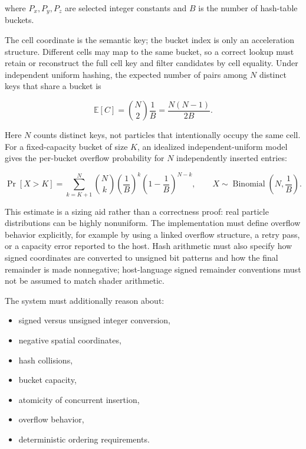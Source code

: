 \documentclass[11pt,a4paper,oneside]{report}
\begin{document}
where $P_x,P_y,P_z$ are selected integer constants and $B$ is the number of hash-table buckets.

The cell coordinate is the semantic key; the bucket index is only an acceleration structure.
Different cells may map to the same bucket, so a correct lookup must retain or reconstruct the
full cell key and filter candidates by cell equality. Under independent uniform hashing, the
expected number of pairs among $N$ distinct keys that share a bucket is

\begin{equation}
\mathbb{E}[C]=\binom{N}{2}\frac{1}{B}
=\frac{N(N-1)}{2B}.
\end{equation}

Here $N$ counts distinct keys, not particles that intentionally occupy the same cell. For a
fixed-capacity bucket of size $K$, an idealized independent-uniform model gives the per-bucket
overflow probability for $N$ independently inserted entries:

\begin{equation}
\Pr[X>K]
=\sum_{k=K+1}^{N}\binom{N}{k}
\left(\frac{1}{B}\right)^k
\left(1-\frac{1}{B}\right)^{N-k},
\qquad X\sim\operatorname{Binomial}\left(N,\frac{1}{B}\right).
\end{equation}

This estimate is a sizing aid rather than a correctness proof: real particle distributions can be
highly nonuniform. The implementation must define overflow behavior explicitly, for example by
using a linked overflow structure, a retry pass, or a capacity error reported to the host. Hash
arithmetic must also specify how signed coordinates are converted to unsigned bit patterns and how
the final remainder is made nonnegative; host-language signed remainder conventions must not be
assumed to match shader arithmetic.

The system must additionally reason about:

\begin{itemize}
  \item signed versus unsigned integer conversion,
  \item negative spatial coordinates,
  \item hash collisions,
  \item bucket capacity,
  \item atomicity of concurrent insertion,
  \item overflow behavior,
  \item deterministic ordering requirements.
\end{itemize}
\end{document}
